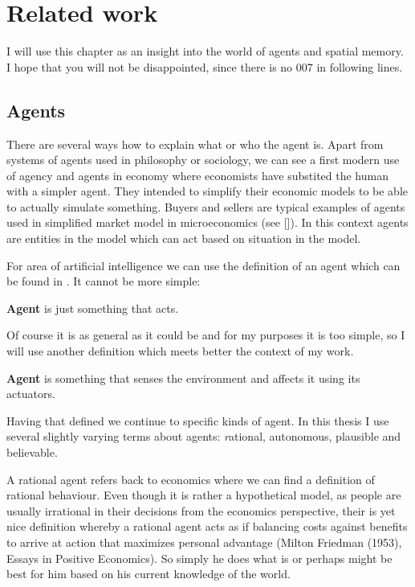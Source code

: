 \chapter{Related work}

I will use this chapter as an insight into the world of agents and spatial memory. I hope that you will not be disappointed, since there is no 007 in following lines.

\section{Agents}

There are several ways how to explain what or who the agent is. Apart from systems of agents used in philosophy or sociology, we can see a first modern use of agency and agents in economy where economists have substited the human with a simpler agent. They intended to simplify their economic models to be able to actually simulate something. Buyers and sellers are typical examples of agents used in simplified market model in microeconomics (see []). In this context agents are entities in the model which can act based on situation in the model.

For area of artificial intelligence we can use the definition of an agent which can be found in \cite{russel2003ai}. It cannot be more simple:

\begin{definition}{\bf Agent} is just something that acts.
\end{definition} 

Of course it is as general as it could be and for my purposes it is too simple, so I will use another definition which meets better the context of my work.

\begin{definition}{\bf Agent} is something that senses the environment and affects it using its actuators.
\end{definition} 

Having that defined we continue to specific kinds of agent. In this thesis I use several slightly varying terms about agents: {\emph rational, autonomous, plausible and believable}. 

A rational agent refers back to economics where we can find a definition of rational behaviour. Even though it is rather a hypothetical model, as people are usually irrational in their decisions from the economics perspective, their is yet nice definition whereby a rational agent acts as if balancing costs against benefits to arrive at action that maximizes personal advantage (Milton Friedman (1953), Essays in Positive Economics). So simply he does what is or perhaps might be best for him based on his current knowledge of the world.
 
